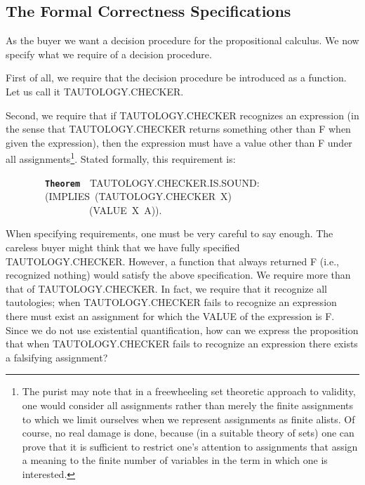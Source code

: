 \documentclass[11pt]{book}
\newenvironment{pubasis}{\begin{flushleft}\ttfamily\small}{\normalsize\rmfamily\end{flushleft}}
\newcommand{\axiomordefinition}[1]{\vspace{6pt}\texttt{\textbf{#1}}}
\newcommand{\pubdefaulttextsize}{\large}
\begin{document}
\subsection{The Formal Correctness Specifications}
\pubdefaulttextsize
As the buyer we want a decision procedure for the propositional
calculus.  We now specify what we require of a decision procedure.

First of all, we require that the decision procedure be introduced as a
function.  Let us call it TAU\-TOL\-OGY.CHECK\-ER.

Second, we require that if TAU\-TOL\-OGY.CHECK\-ER recognizes an expression
(in the sense that TAU\-TOL\-OGY.CHECK\-ER returns something other than F
when given the expression), then the expression must have a value
other than F under all assignments\footnote{The purist may  note that in a freewheeling set theoretic approach to validity, one would consider all assignments rather than merely the finite assignments to which we limit ourselves when we represent assignments as finite alists.  Of course, no real damage is done, because (in a suitable theory of sets) one can prove that it is sufficient to restrict one's attention to assignments that assign a meaning to the finite number of variables in the term in which one is interested.}.
Stated formally, this requirement is:
\begin{pubasis}
~~~~~~~~\axiomordefinition{Theorem}~~TAU\-TOL\-OGY.CHECK\-ER.IS.SOUND:\\
~~~~~~~~(IMPLIES~(TAU\-TOL\-OGY.CHECK\-ER~X)\\
~~~~~~~~~~~~~~~~~(VALUE~X~A)).\\
\end{pubasis}
When specifying requirements, one must be
very careful to say enough.  The careless buyer might think that we have
fully specified TAU\-TOL\-OGY.CHECK\-ER.  However, a function that always returned
F (i.e., recognized nothing) would satisfy the above specification.
We require more than that of
TAU\-TOL\-OGY.CHECK\-ER.  In fact, we require that it
recognize all tautologies; when TAU\-TOL\-OGY.CHECK\-ER fails to recognize an expression
there must exist an
assignment for which the VALUE of the expression is F.
Since we do not use existential quantification, how can
we express the proposition that when TAU\-TOL\-OGY.CHECK\-ER fails
to recognize an expression there exists a falsifying assignment?
\end{document}
